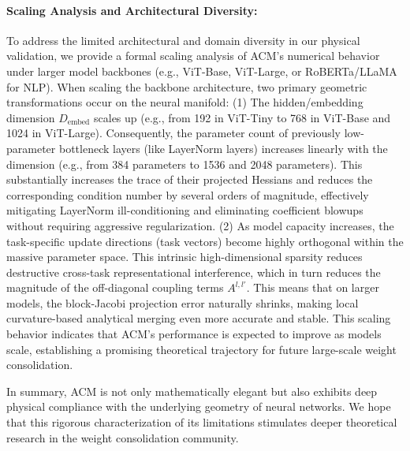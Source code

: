 \paragraph{Scaling Analysis and Architectural Diversity:}
To address the limited architectural and domain diversity in our physical validation, we provide a formal scaling analysis of ACM's numerical behavior under larger model backbones (e.g., ViT-Base, ViT-Large, or RoBERTa/LLaMA for NLP). When scaling the backbone architecture, two primary geometric transformations occur on the neural manifold: (1) The hidden/embedding dimension $D_{\text{embed}}$ scales up (e.g., from 192 in ViT-Tiny to 768 in ViT-Base and 1024 in ViT-Large). Consequently, the parameter count of previously low-parameter bottleneck layers (like LayerNorm layers) increases linearly with the dimension (e.g., from 384 parameters to 1536 and 2048 parameters). This substantially increases the trace of their projected Hessians and reduces the corresponding condition number by several orders of magnitude, effectively mitigating LayerNorm ill-conditioning and eliminating coefficient blowups without requiring aggressive regularization. (2) As model capacity increases, the task-specific update directions (task vectors) become highly orthogonal within the massive parameter space. This intrinsic high-dimensional sparsity reduces destructive cross-task representational interference, which in turn reduces the magnitude of the off-diagonal coupling terms $A^{l, l'}$. This means that on larger models, the block-Jacobi projection error naturally shrinks, making local curvature-based analytical merging even more accurate and stable. This scaling behavior indicates that ACM's performance is expected to improve as models scale, establishing a promising theoretical trajectory for future large-scale weight consolidation.

In summary, ACM is not only mathematically elegant but also exhibits deep physical compliance with the underlying geometry of neural networks. We hope that this rigorous characterization of its limitations stimulates deeper theoretical research in the weight consolidation community.
